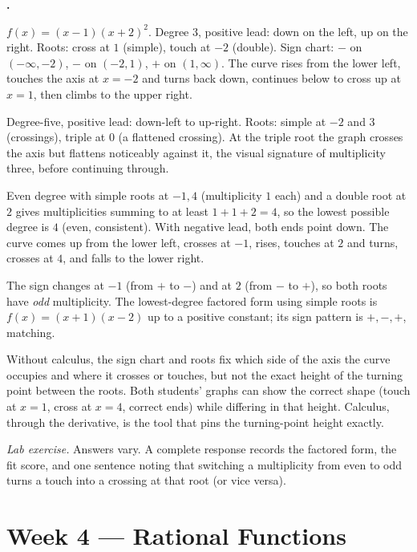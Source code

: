 \documentclass[12pt]{book}
\newcounter{soln}[section]
\newenvironment{solutions}{%
  \setcounter{soln}{0}%
  \begin{list}{\textbf{\arabic{soln}.}}{%
    \usecounter{soln}\setlength{\leftmargin}{2.2em}\setlength{\itemsep}{10pt}}%
}{\end{list}}
\begin{document}
\begin{solutions}
\item $f(x)=(x-1)(x+2)^2$. Degree $3$, positive lead: down on the left, up on the
right. Roots: cross at $1$ (simple), touch at $-2$ (double). Sign chart: $-$ on
$(-\infty,-2)$, $-$ on $(-2,1)$, $+$ on $(1,\infty)$. The curve rises from the lower
left, touches the axis at $x=-2$ and turns back down, continues below to cross up at
$x=1$, then climbs to the upper right.

\item Degree-five, positive lead: down-left to up-right. Roots: simple at $-2$ and $3$
(crossings), triple at $0$ (a flattened crossing). At the triple root the graph
crosses the axis but flattens noticeably against it, the visual signature of
multiplicity three, before continuing through.

\item Even degree with simple roots at $-1,4$ (multiplicity $1$ each) and a double root
at $2$ gives multiplicities summing to at least $1+1+2=4$, so the lowest possible
degree is $4$ (even, consistent). With negative lead, both ends point down. The curve
comes up from the lower left, crosses at $-1$, rises, touches at $2$ and turns, crosses
at $4$, and falls to the lower right.

\item The sign changes at $-1$ (from $+$ to $-$) and at $2$ (from $-$ to $+$), so both
roots have \emph{odd} multiplicity. The lowest-degree factored form using simple roots
is $f(x)=(x+1)(x-2)$ up to a positive constant; its sign pattern is $+,-,+$, matching.

\item Without calculus, the sign chart and roots fix which side of the axis the curve
occupies and where it crosses or touches, but not the exact height of the turning
point between the roots. Both students' graphs can show the correct shape (touch at
$x=1$, cross at $x=4$, correct ends) while differing in that height. Calculus, through
the derivative, is the tool that pins the turning-point height exactly.

\item \emph{Lab exercise.} Answers vary. A complete response records the factored form,
the fit score, and one sentence noting that switching a multiplicity from even to odd
turns a touch into a crossing at that root (or vice versa).
\end{solutions}

\section*{Week 4 — Rational Functions}
\setcounter{section}{4}
\end{document}
